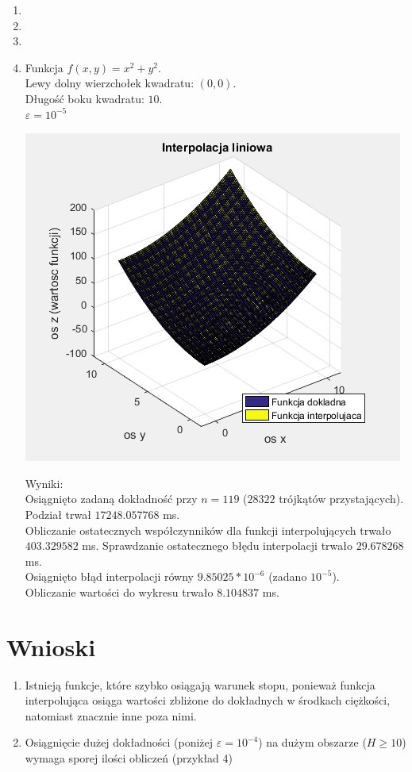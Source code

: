 \documentclass[12pt]{article}
\begin{document}
	\begin{enumerate}[label=\textbf{Przykład \arabic*}]
		\item
		\item
		\item
		\item
		Funkcja $f(x, y) = x^2 + y^2$.\\
		Lewy dolny wierzchołek kwadratu: $(0, 0)$.\\
		Długość boku kwadratu: $10$.\\
		$\varepsilon = 10^{-5}$
		
		\includegraphics[]{images/example-4.png}
		
		Wyniki:\\
		Osiągnięto zadaną dokładność przy $n = 119$ ($28322$ trójkątów przystających).\\
		Podział trwał $17248.057768$ ms.\\
		Obliczanie ostatecznych współczynników dla funkcji interpolujących trwało $403.329582$ ms.
		Sprawdzanie ostatecznego błędu interpolacji trwało $29.678268$ ms.\\
		Osiągnięto błąd interpolacji równy $9.85025 * 10^{-6}$ (zadano $10^{-5}$).\\
		Obliczanie wartości do wykresu trwało $8.104837$ ms.
		
	\end{enumerate}
	
	\section{Wnioski}
	\begin{enumerate}
		\item Istnieją funkcje, które szybko osiągają warunek stopu, ponieważ funkcja interpolująca osiąga wartości zbliżone do dokładnych w środkach ciężkości, natomiast znacznie inne poza nimi.
		\item Osiągnięcie dużej dokładności (poniżej $\varepsilon = 10^{-4}$) na dużym obszarze ($H \geq 10$) wymaga sporej ilości obliczeń (przykład 4)
	\end{enumerate}
	
\end{document}
